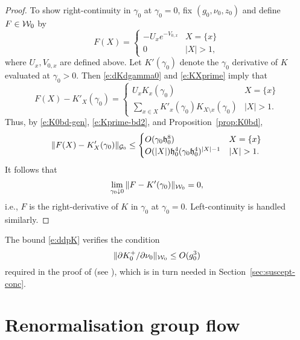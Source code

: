 \begin{proof}
To show right-continuity in $\gamma_0$ at $\gamma_0 = 0$,
fix $(g_0, \nu_0, z_0)$ and define $F \in \mathcal{W}_0$ by
\begin{equation}
F(X) =
\begin{cases}
  -U_x e^{-V_{0,x}}
    & X = \{ x \} \\
  0 & |X| > 1,
\end{cases}
\end{equation}
where $U_x, V_{0,x}$ are defined above.
Let $K'(\gamma_0)$ denote the $\gamma_0$ derivative of $K$ evaluated at $\gamma_0 > 0$.  Then
\eqref{e:dKdgamma0} and \eqref{e:KXprime} imply that
\begin{equation}
F(X) - K'_X(\gamma_0)
  =
\begin{cases}
  U_x K_x(\gamma_0)
    & X = \{ x \} \\
  \sum_{x \in X} K'_x(\gamma_0) K_{X \setminus x}(\gamma_0)
    & |X| > 1.
\end{cases}
\end{equation}
Thus, by \eqref{e:K0bd-gen}, \eqref{e:Kprime-bd2}, and Proposition~\ref{prop:K0bd},
\begin{equation}
\|F(X) - K'_X(\gamma_0)\|_{\mathcal{G}_0}
  \le
\begin{cases}
  O(\gamma_0 \mathfrak{h}_0^8)
    & X = \{ x \} \\
  O(|X|) \mathfrak{h}_0^4 (\gamma_0 \mathfrak{h}_0^4)^{|X|-1}
    & |X| > 1.
\end{cases}
\end{equation}
It follows that
\begin{equation}
\lim_{\gamma_0\downarrow 0} \|F - K'(\gamma_0)\|_{\mathcal{W}_0} = 0,
\end{equation}
i.e., $F$ is the right-derivative of $K$ in $\gamma_0$ at $\gamma_0 = 0$.
Left-continuity is handled similarly.
\end{proof}

\begin{rk}
\label{rk:DK-base-case}
The bound \eqref{e:ddpK} verifies the condition
\begin{equation}
\|\partial K^+_0/\partial\nu_0\|_{\mathcal{W}_0} \le O(g_0^3)
\end{equation}
required in the proof of \cite[Lemma~\ref{log-lem:gzmuprime}]{BBS-saw4-log}
(see \cite[\eqref{log-e:induct1}]{BBS-saw4-log}),
which is in turn needed in Section~\ref{sec:suscept-conc}.
\end{rk}

\section{Renormalisation group flow}
\label{sec:flow}


